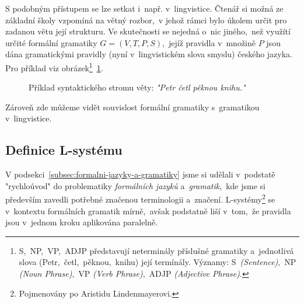 S podobným přístupem se lze setkat i~např. v~lingvistice. Čtenář si možná ze základní školy vzpomíná na větný rozbor,~v jehož rámci bylo úkolem určit pro zadanou větu její strukturu. Ve skutečnosti se nejedná o~nic jiného,~než využítí určité formální gramatiky $G=(V,T,P,S)$,~jejíž pravidla v~množině $P$ jsou dána gramatickými pravidly (nyní v~lingvistickém slova smyslu) českého jazyka. Pro příklad viz obrázek\footnote{S,~NP,~VP,~ADJP představují neterminály příslušné gramatiky a~jednotlivá slova (Petr,~četl,~pěknou,~knihu) její termínály. Významy: S~\emph{(Sentence)},~NP \emph{(Noun Phrase)},~VP \emph{(Verb Phrase)},~ADJP \emph{(Adjective Phrase)}.}~\ref{fig:syntax-strom-vety}.
\begin{figure}[h]
    \centering
    \caption{Příklad syntaktického stromu věty: \emph{"Petr četl pěknou knihu."}}
    \label{fig:syntax-strom-vety}
\end{figure}
Zároveň zde můžeme vidět souvislost formální gramatiky s~gramatikou v~lingvistice.

\subsection{Definice L-systému}\label{subsec:definice-lsystemu}

V podsekci~\ref{subsec:formalni-jazyky-a-gramatiky} jsme si udělali v~podstatě "rychloúvod" do problematiky \emph{formálních jazyků} a~\emph{gramatik},~kde jsme si především zavedli potřebné značenou terminologii a~značení. L-systémy\footnote{Pojmenovány po Aristidu Lindenmayerovi.} se v~kontextu formálních gramatik mírně,~avšak podstatně liší v~tom,~že pravidla jsou v~jednom kroku aplikována paralelně.

